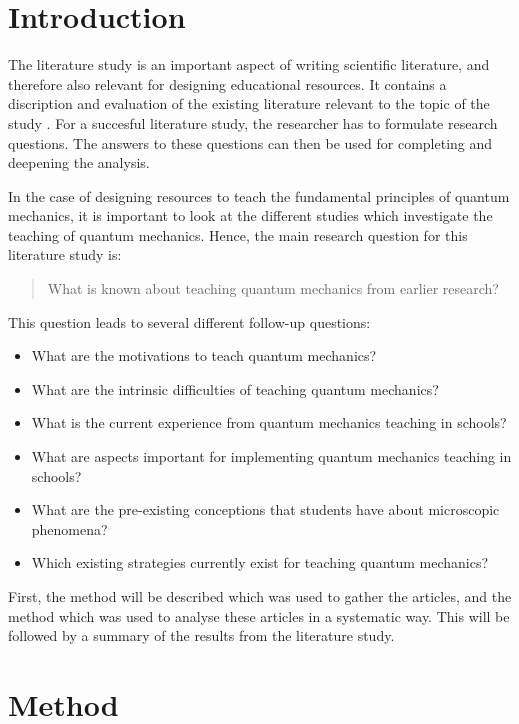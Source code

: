 \documentclass[11pt,twoside]{report} %
\begin{document}
\section{Introduction}

The literature study is an important aspect of writing scientific literature, and therefore also relevant for designing educational resources. It contains a discription and evaluation of the existing literature relevant to the topic of the study \cite{lerencomm}. For a succesful literature study, the researcher has to formulate research questions. The answers to these questions can then be used for completing and deepening the analysis.

In the case of designing resources to teach the fundamental principles of quantum mechanics, it is important to look at the different studies which investigate the teaching of quantum mechanics. Hence, the main research question for this literature study is:

\begin{quote} What is known about teaching quantum mechanics from earlier research? \end{quote}
This question leads to several different follow-up questions:

\begin{itemize}
\item What are the motivations to teach quantum mechanics?
\item What are the intrinsic difficulties of teaching quantum mechanics?
\item What is the current experience from quantum mechanics teaching in schools?
\item What are aspects important for implementing quantum mechanics teaching in schools?
\item What are the pre-existing conceptions that students have about microscopic phenomena?
\item Which existing strategies currently exist for teaching quantum mechanics?
\end{itemize}

First, the method will be described which was used to gather the articles, and the method which was used to analyse these articles in a systematic way. This will be followed by a summary of the results from the literature study.

\section{Method}
\end{document}
